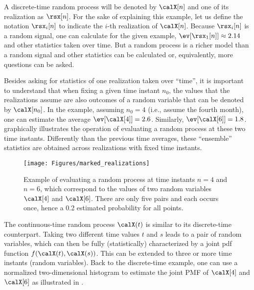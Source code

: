 A discrete-time random process will be denoted by $\calX[n]$ and one of its realization as $\rsx[n]$. 
For the sake of explaining this example, let us define the notation $\rsx_i[n]$ to indicate the $i$-th realization of $\calX[n]$. Because $\rsx_i[n]$ is a random signal, one can calculate for the given example, $\ev [\rsx_1[n]] \approx 2.14$ and other statistics taken over time.
But a random process is a richer model than a random signal and other statistics can be calculated or, equivalently, more questions can be asked.

Besides asking for statistics of one realization taken over ``time'', it is important to understand that when fixing a given time instant $n_0$, the values that the realizations assume are also outcomes of a random variable that can be denoted by $\calX[n_0]$. In the example, assuming $n_0= 4$ (i.e., assume the fourth month), one can estimate the average $\ev [\calX[4]] = 2.6$. Similarly, $\ev [\calX[6]] = 1.8$.  graphically illustrates the operation of evaluating a random process at these two time instants. Differently than the previous time averages, these ``ensemble'' statistics are obtained across realizations with fixed time instants.

\begin{figure}[htbp]
	\centering
		\texttt{[image: Figures/marked\_realizations]}		
	\caption[{Example of evaluating a random process at time instants $n=4$ and $n=6$, which correspond to the values of two random variables $\calX[4]$ and $\calX[6]$.}]{Example of evaluating a random process at time instants $n=4$ and $n=6$, which correspond to the values of two random variables $\calX[4]$ and $\calX[6]$. There are only five pairs and each occurs once, hence a 0.2 estimated probability for all points.\label{fig:marked_realizations}}
\end{figure}

The continuous-time random process $\calX(t)$ is similar to its discrete-time counterpart. Taking two different time values $t$ and $s$ leads to a pair of random variables, which can then be fully (statistically) characterized by a joint pdf function $f(\calX(t),\calX(s))$. This can be extended to three or more time instants (random variables). Back to the discrete-time example, one can use a normalized two-dimensional histogram to estimate the joint PMF of $\calX[4]$ and $\calX[6]$ as illustrated in .

